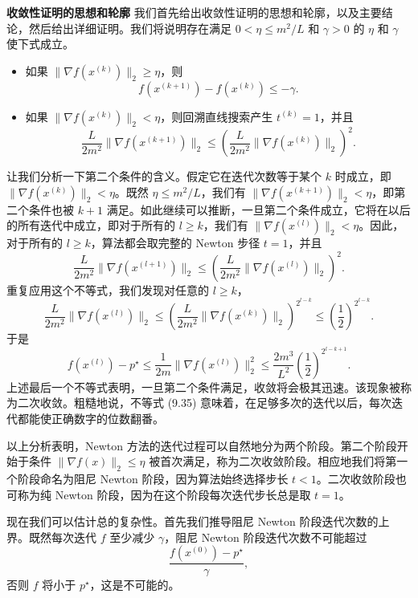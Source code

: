 \documentclass[UTF8,12pt,a4paper,fontset=fandol]{ctexart}
\begin{document}
\noindent\textbf{收敛性证明的思想和轮廓}\quad
我们首先给出收敛性证明的思想和轮廓，以及主要结论，然后给出详细证明。我们将说明存在满足 $0<\eta\leq m^2/L$ 和 $\gamma>0$ 的 $\eta$ 和 $\gamma$ 使下式成立。
\begin{itemize}
\item 如果 $\|\nabla f(x^{(k)})\|_2\geq\eta$，则
\begin{equation}
f(x^{(k+1)})-f(x^{(k)})\leq-\gamma.
\tag{9.32}
\end{equation}
\item 如果 $\|\nabla f(x^{(k)})\|_2<\eta$，则回溯直线搜索产生 $t^{(k)}=1$，并且
\begin{equation}
\frac{L}{2m^2}\|\nabla f(x^{(k+1)})\|_2
\leq\left(\frac{L}{2m^2}\|\nabla f(x^{(k)})\|_2\right)^2.
\tag{9.33}
\end{equation}
\end{itemize}

让我们分析一下第二个条件的含义。假定它在迭代次数等于某个 $k$ 时成立，即 $\|\nabla f(x^{(k)})\|_2<\eta$。既然 $\eta\leq m^2/L$，我们有 $\|\nabla f(x^{(k+1)})\|_2<\eta$，即第二个条件也被 $k+1$ 满足。如此继续可以推断，一旦第二个条件成立，它将在以后的所有迭代中成立，即对于所有的 $l\geq k$，我们有 $\|\nabla f(x^{(l)})\|_2<\eta$。因此，对于所有的 $l\geq k$，算法都会取完整的 Newton 步径 $t=1$，并且
\begin{equation}
\frac{L}{2m^2}\|\nabla f(x^{(l+1)})\|_2
\leq\left(\frac{L}{2m^2}\|\nabla f(x^{(l)})\|_2\right)^2.
\tag{9.34}
\end{equation}
重复应用这个不等式，我们发现对任意的 $l\geq k$，
\[
\frac{L}{2m^2}\|\nabla f(x^{(l)})\|_2
\leq\left(\frac{L}{2m^2}\|\nabla f(x^{(k)})\|_2\right)^{2^{l-k}}
\leq\left(\frac{1}{2}\right)^{2^{l-k}}.
\]
于是
\begin{equation}
f(x^{(l)})-p^\star
\leq\frac{1}{2m}\|\nabla f(x^{(l)})\|_2^2
\leq\frac{2m^3}{L^2}\left(\frac{1}{2}\right)^{2^{l-k+1}}.
\tag{9.35}
\end{equation}
上述最后一个不等式表明，一旦第二个条件满足，收敛将会极其迅速。该现象被称为二次收敛。粗糙地说，不等式 (9.35) 意味着，在足够多次的迭代以后，每次迭代都能使正确数字的位数翻番。

以上分析表明，Newton 方法的迭代过程可以自然地分为两个阶段。第二个阶段开始于条件 $\|\nabla f(x)\|_2\leq\eta$ 被首次满足，称为二次收敛阶段。相应地我们将第一个阶段命名为阻尼 Newton 阶段，因为算法始终选择步长 $t<1$。二次收敛阶段也可称为纯 Newton 阶段，因为在这个阶段每次迭代步长总是取 $t=1$。

现在我们可以估计总的复杂性。首先我们推导阻尼 Newton 阶段迭代次数的上界。既然每次迭代 $f$ 至少减少 $\gamma$，阻尼 Newton 阶段迭代次数不可能超过
\[
\frac{f(x^{(0)})-p^\star}{\gamma},
\]
否则 $f$ 将小于 $p^\star$，这是不可能的。
\end{document}
